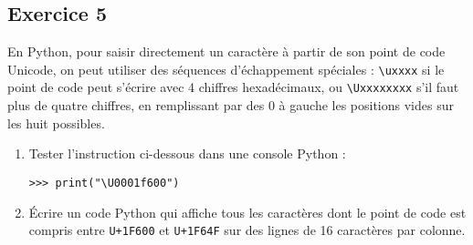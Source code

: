 \documentclass[11pt,a4paper]{article}
\renewcommand{\theenumi}{\textbf{\arabic{enumi}}}
\renewcommand{\labelenumi}{\textbf{\theenumi.}}
\providecommand{\tightlist}{\setlength{\itemsep}{0pt}\setlength{\parskip}{0pt}}
\begin{document}
 

\hypertarget{fontawesome-solid-computer-exercice-5}{%
\subsection*{\faDesktop{} Exercice
5}\label{fontawesome-solid-computer-exercice-5}}

En Python, pour saisir directement un caractère à partir de son point de
code Unicode, on peut utiliser des séquences d'échappement spéciales :
\lstinline!\uxxxx! si le point de code peut s'écrire avec 4 chiffres hexadécimaux,
ou \lstinline!\Uxxxxxxxx! s'il faut plus de quatre chiffres, en remplissant par
des 0 à gauche les positions vides sur les huit possibles.

\begin{enumerate}
\def\labelenumi{\arabic{enumi}.}
\tightlist
\item
  Tester l'instruction ci-dessous dans une console Python :

\begin{center}
\begin{minipage}{5cm}
\begin{verbatim}
>>> print("\U0001f600")
\end{verbatim}
\end{minipage}
\end{center}
  
\item
  Écrire un code Python qui affiche tous les caractères dont le point de
  code est compris entre \texttt{U+1F600} et \texttt{U+1F64F} sur des
  lignes de 16 caractères par colonne.
\end{enumerate}
\end{document}
